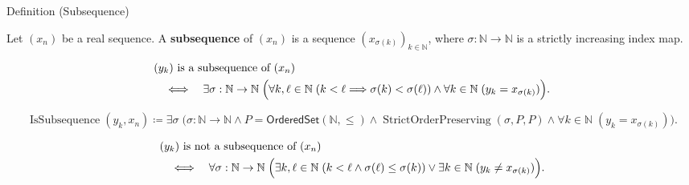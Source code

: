 
\begin{definitionbox}{Definition (Subsequence)}
\begin{definition}[Subsequence]
\label{def:subsequence-of-sequence}
Let $(x_n)$ be a real sequence. A \textbf{subsequence} of $(x_n)$ is a
sequence $(x_{\sigma(k)})_{k\in\mathbb{N}}$, where
$\sigma:\mathbb{N}\to\mathbb{N}$ is a strictly increasing index map.
\end{definition}
\end{definitionbox}

\begin{remark*}
\[
\begin{aligned}
&(y_k)\text{ is a subsequence of }(x_n)\\
&\quad\Longleftrightarrow\quad
\exists \sigma:\mathbb{N}\to\mathbb{N}\;
\Bigl(
  \forall k,\ell\in\mathbb{N}\;(k<\ell\Longrightarrow \sigma(k)<\sigma(\ell))
  \land
  \forall k\in\mathbb{N}\;(y_k=x_{\sigma(k)})
\Bigr).
\end{aligned}
\]
\end{remark*}

\begin{remark*}
\[
\operatorname{IsSubsequence}(y_k,x_n)
\coloneqq
\exists \sigma\;
\bigl(
  \sigma\colon\mathbb{N}\to\mathbb{N}
  \land
  P=\mathsf{OrderedSet}(\mathbb{N},\leq)
  \land
  \operatorname{StrictOrderPreserving}(\sigma,P,P)
  \land
  \forall k\in\mathbb{N}\;(y_k=x_{\sigma(k)})
\bigr).
\]
\end{remark*}

\begin{remark*}
\[
\begin{aligned}
&(y_k)\text{ is not a subsequence of }(x_n)\\
&\quad\Longleftrightarrow\quad
\forall \sigma:\mathbb{N}\to\mathbb{N}\;
\Bigl(
  \exists k,\ell\in\mathbb{N}\;(k<\ell\land \sigma(\ell)\le\sigma(k))
  \lor
  \exists k\in\mathbb{N}\;(y_k\neq x_{\sigma(k)})
\Bigr).
\end{aligned}
\]
\end{remark*}

